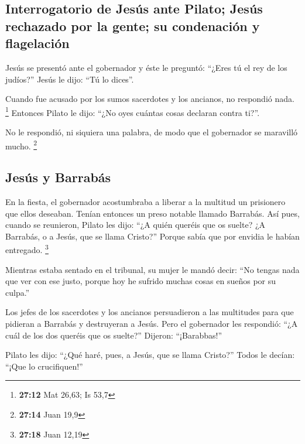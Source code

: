 \hypertarget{interrogatorio-de-jesuxfas-ante-pilato-jesuxfas-rechazado-por-la-gente-su-condenaciuxf3n-y-flagelaciuxf3n}{%
\subsection{Interrogatorio de Jesús ante Pilato; Jesús rechazado por la
gente; su condenación y
flagelación}\label{interrogatorio-de-jesuxfas-ante-pilato-jesuxfas-rechazado-por-la-gente-su-condenaciuxf3n-y-flagelaciuxf3n}}

 Jesús se presentó ante el gobernador y éste le preguntó:
``¿Eres tú el rey de los judíos?'' Jesús le dijo: ``Tú lo dices''.

 Cuando fue acusado por los sumos sacerdotes y los
ancianos, no respondió nada. \footnote{\textbf{27:12} Mat 26,63; Is 53,7}
 Entonces Pilato le dijo: ``¿No oyes cuántas cosas
declaran contra ti?''.

 No le respondió, ni siquiera una palabra, de modo que el
gobernador se maravilló mucho. \footnote{\textbf{27:14} Juan 19,9}

\hypertarget{jesuxfas-y-barrabuxe1s}{%
\subsection{Jesús y Barrabás}\label{jesuxfas-y-barrabuxe1s}}

 En la fiesta, el gobernador acostumbraba a liberar a la
multitud un prisionero que ellos deseaban.  Tenían
entonces un preso notable llamado Barrabás.  Así pues,
cuando se reunieron, Pilato les dijo: ``¿A quién queréis que os suelte?
¿A Barrabás, o a Jesús, que se llama Cristo?''  Porque
sabía que por envidia le habían entregado. \footnote{\textbf{27:18} Juan
  12,19}

 Mientras estaba sentado en el tribunal, su mujer le
mandó decir: ``No tengas nada que ver con ese justo, porque hoy he
sufrido muchas cosas en sueños por su culpa.''

 Los jefes de los sacerdotes y los ancianos persuadieron
a las multitudes para que pidieran a Barrabás y destruyeran a Jesús.
 Pero el gobernador les respondió: ``¿A cuál de los dos
queréis que os suelte?'' Dijeron: ``¡Barabbas!''

 Pilato les dijo: ``¿Qué haré, pues, a Jesús, que se
llama Cristo?'' Todos le decían: ``¡Que lo crucifiquen!''


